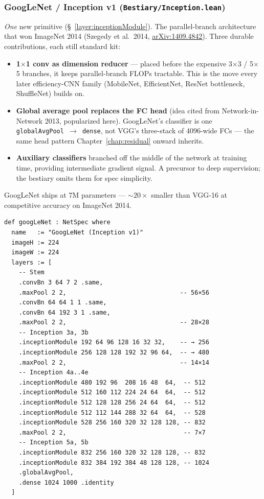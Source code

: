 \subsubsection*{GoogLeNet / Inception v1 (\texttt{Bestiary/Inception.lean})}
\emph{One} new primitive (\S~\ref{layer:inceptionModule}). The
parallel-branch architecture that won ImageNet 2014 (Szegedy et
al.\ 2014, \href{https://arxiv.org/abs/1409.4842}{arXiv:1409.4842}).
Three durable contributions, each still standard kit:

\begin{itemize}
  \item \textbf{1$\times$1 conv as dimension reducer} --- placed
    before the expensive 3$\times$3 / 5$\times$5 branches, it
    keeps parallel-branch FLOPs tractable. This is the move every
    later efficiency-CNN family (MobileNet, EfficientNet, ResNet
    bottleneck, ShuffleNet) builds on.
  \item \textbf{Global average pool replaces the FC head}
    (idea cited from Network-in-Network 2013, popularized here).
    GoogLeNet's classifier is one \texttt{globalAvgPool $\to$ dense},
    not VGG's three-stack of 4096-wide FCs --- the same head
    pattern Chapter~\ref{chap:residual} onward inherits.
  \item \textbf{Auxiliary classifiers} branched off the middle of
    the network at training time, providing intermediate gradient
    signal. A precursor to deep supervision; the bestiary omits
    them for spec simplicity.
\end{itemize}

GoogLeNet ships at 7M parameters --- $\sim$$20\times$ smaller
than VGG-16 at competitive accuracy on ImageNet 2014.

\begin{verbatim}
def googLeNet : NetSpec where
  name   := "GoogLeNet (Inception v1)"
  imageH := 224
  imageW := 224
  layers := [
    -- Stem
    .convBn 3 64 7 2 .same,
    .maxPool 2 2,                               -- 56×56
    .convBn 64 64 1 1 .same,
    .convBn 64 192 3 1 .same,
    .maxPool 2 2,                               -- 28×28
    -- Inception 3a, 3b
    .inceptionModule 192 64 96 128 16 32 32,    -- → 256
    .inceptionModule 256 128 128 192 32 96 64,  -- → 480
    .maxPool 2 2,                               -- 14×14
    -- Inception 4a..4e
    .inceptionModule 480 192 96  208 16 48  64,  -- 512
    .inceptionModule 512 160 112 224 24 64  64,  -- 512
    .inceptionModule 512 128 128 256 24 64  64,  -- 512
    .inceptionModule 512 112 144 288 32 64  64,  -- 528
    .inceptionModule 528 256 160 320 32 128 128, -- 832
    .maxPool 2 2,                                -- 7×7
    -- Inception 5a, 5b
    .inceptionModule 832 256 160 320 32 128 128, -- 832
    .inceptionModule 832 384 192 384 48 128 128, -- 1024
    .globalAvgPool,
    .dense 1024 1000 .identity
  ]
\end{verbatim}


